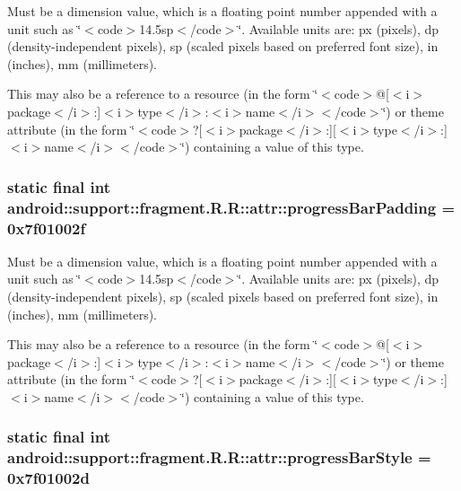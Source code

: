 Must be a dimension value, which is a floating point number appended with a unit such as \char`\"{}$<$code$>$14.5sp$<$/code$>$\char`\"{}. Available units are: px (pixels), dp (density-independent pixels), sp (scaled pixels based on preferred font size), in (inches), mm (millimeters). 

This may also be a reference to a resource (in the form \char`\"{}$<$code$>$@\mbox{[}$<$i$>$package$<$/i$>$:\mbox{]}$<$i$>$type$<$/i$>$:$<$i$>$name$<$/i$>$$<$/code$>$\char`\"{}) or theme attribute (in the form \char`\"{}$<$code$>$?\mbox{[}$<$i$>$package$<$/i$>$:\mbox{]}\mbox{[}$<$i$>$type$<$/i$>$:\mbox{]}$<$i$>$name$<$/i$>$$<$/code$>$\char`\"{}) containing a value of this type. \hypertarget{classandroid_1_1support_1_1fragment_1_1_r_1_1attr_e0b5777e29885afda846149b738a2d21}{
\subsubsection[{progressBarPadding}]{\setlength{\rightskip}{0pt plus 5cm}static final int android::support::fragment.R.R::attr::progressBarPadding = 0x7f01002f}}
\label{classandroid_1_1support_1_1fragment_1_1_r_1_1attr_e0b5777e29885afda846149b738a2d21}


Must be a dimension value, which is a floating point number appended with a unit such as \char`\"{}$<$code$>$14.5sp$<$/code$>$\char`\"{}. Available units are: px (pixels), dp (density-independent pixels), sp (scaled pixels based on preferred font size), in (inches), mm (millimeters). 

This may also be a reference to a resource (in the form \char`\"{}$<$code$>$@\mbox{[}$<$i$>$package$<$/i$>$:\mbox{]}$<$i$>$type$<$/i$>$:$<$i$>$name$<$/i$>$$<$/code$>$\char`\"{}) or theme attribute (in the form \char`\"{}$<$code$>$?\mbox{[}$<$i$>$package$<$/i$>$:\mbox{]}\mbox{[}$<$i$>$type$<$/i$>$:\mbox{]}$<$i$>$name$<$/i$>$$<$/code$>$\char`\"{}) containing a value of this type. \hypertarget{classandroid_1_1support_1_1fragment_1_1_r_1_1attr_a4b4e3f84160d00aecb0b74d4657568a}{
\subsubsection[{progressBarStyle}]{\setlength{\rightskip}{0pt plus 5cm}static final int android::support::fragment.R.R::attr::progressBarStyle = 0x7f01002d}}
\label{classandroid_1_1support_1_1fragment_1_1_r_1_1attr_a4b4e3f84160d00aecb0b74d4657568a}


